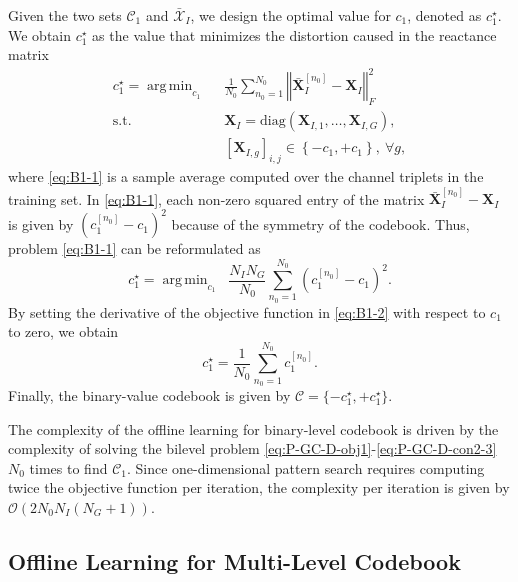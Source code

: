 \documentclass[twocolumn,10pt]{IEEEtran}
\DeclareMathOperator*{\argmin}{arg\,min}
\begin{document}
Given the two sets $\mathcal{C}_1$ and $\bar{\mathcal{X}}_I$, we design the optimal value for $c_1$, denoted as $c_1^\star$.
We obtain $c_{1}^\star$ as the value that minimizes the distortion caused in the reactance matrix
\begin{align}
c_1^\star=\argmin_{c_{1}}\;\;
& \frac{1}{N_0}\sum_{n_0=1}^{N_0}\left\Vert\bar{\mathbf{X}}_I^{[n_0]}-\mathbf{X}_I\right\Vert_F^2\label{eq:B1-1}\\
\mathsf{\mathrm{s.t.}}\;\;\;
& \mathbf{X}_{I}=\mathrm{diag}\left(\mathbf{X}_{I,1},\ldots,\mathbf{X}_{I,G}\right),\\
& \left[\mathbf{X}_{I,g}\right]_{i,j}\in\left\{-c_1,+c_1\right\},\:\forall g,
\end{align}
where \eqref{eq:B1-1} is a sample average computed over the channel triplets in the training set.
In \eqref{eq:B1-1}, each non-zero squared entry of the matrix $\bar{\mathbf{X}}_I^{[n_0]}-\mathbf{X}_I$ is given by $(c_1^{[n_0]}-c_1)^2$ because of the symmetry of the codebook.
Thus, problem \eqref{eq:B1-1} can be reformulated as
\begin{equation}
c_1^\star=\argmin_{c_{1}}\;\;\frac{N_IN_G}{N_0}\sum_{n_0=1}^{N_0}\left(c_1^{[n_0]}-c_1\right)^2.\label{eq:B1-2}
\end{equation}
By setting the derivative of the objective function in \eqref{eq:B1-2} with respect to $c_1$ to zero, we obtain
\begin{equation}
c_1^\star=\frac{1}{N_0}\sum_{n_0=1}^{N_0}c_1^{[n_0]}.\label{eq:B1-3}
\end{equation}
Finally, the binary-value codebook is given by $\mathcal{C}=\{-c_1^\star,+c_1^\star\}$.

The complexity of the offline learning for binary-level codebook is driven by the complexity of solving the bilevel problem \eqref{eq:P-GC-D-obj1}-\eqref{eq:P-GC-D-con2-3} $N_0$ times to find $\mathcal{C}_1$.
Since one-dimensional pattern search requires computing twice the objective function per iteration, the complexity per iteration is given by $\mathcal{O}(2N_0N_I(N_G+1))$.

\subsection{Offline Learning for Multi-Level Codebook}
\label{sec:scalar-discrete-multi}
\end{document}
